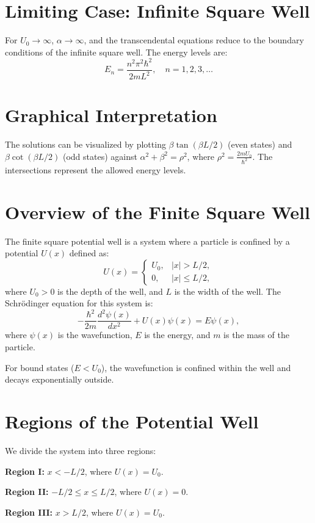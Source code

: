 \documentclass[a4paper,12pt]{article}
\begin{document}
\begin{multicols}{2}
\section{Limiting Case: Infinite Square Well}
For \( U_0 \to \infty \), \( \alpha \to \infty \), and the transcendental equations reduce to the boundary conditions of the infinite square well. The energy levels are:
\[
E_n = \frac{n^2 \pi^2 \hbar^2}{2mL^2}, \quad n = 1, 2, 3, \dots
\]

\section{Graphical Interpretation}
The solutions can be visualized by plotting \( \beta \tan(\beta L/2) \) (even states) and \( \beta \cot(\beta L/2) \) (odd states) against \( \alpha^2 + \beta^2 = \rho^2 \), where \( \rho^2 = \frac{2mU_0}{\hbar^2} \). The intersections represent the allowed energy levels.

\section{Overview of the Finite Square Well}
The finite square potential well is a system where a particle is confined by a potential \( U(x) \) defined as:
\[
U(x) = 
\begin{cases} 
U_0, & |x| > L/2, \\
0, & |x| \leq L/2,
\end{cases}
\]
where \( U_0 > 0 \) is the depth of the well, and \( L \) is the width of the well. The Schrödinger equation for this system is:
\[
-\frac{\hbar^2}{2m} \frac{d^2\psi(x)}{dx^2} + U(x)\psi(x) = E\psi(x),
\]
where \( \psi(x) \) is the wavefunction, \( E \) is the energy, and \( m \) is the mass of the particle.

For bound states (\( E < U_0 \)), the wavefunction is confined within the well and decays exponentially outside.

\section{Regions of the Potential Well}
We divide the system into three regions:

\textbf{Region I:} \( x < -L/2 \), where \( U(x) = U_0 \).

\textbf{Region II:} \( -L/2 \leq x \leq L/2 \), where \( U(x) = 0 \).

\textbf{Region III:} \( x > L/2 \), where \( U(x) = U_0 \).


\end{multicols}
\end{document}
